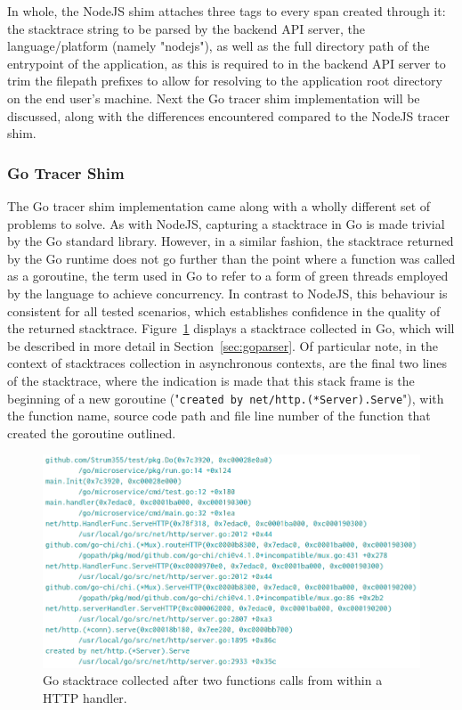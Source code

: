 \documentclass[12pt,pdftex,titlepage]{report}
\begin{document}
                    In whole, the NodeJS shim attaches three tags to every span created through it: the stacktrace string to be parsed by the backend API server, the language/platform (namely "nodejs"), as well
                    as the full directory path of the entrypoint of the application, as this is required to in the backend API server to trim the filepath prefixes to allow for resolving to the application
                    root directory on the end user's machine. Next the Go tracer shim implementation will be discussed, along with the differences encountered compared to the NodeJS tracer shim.

                \subsubsection{Go Tracer Shim}
                    The Go tracer shim implementation came along with a wholly different set of problems to solve. As with NodeJS, capturing a stacktrace in Go is made trivial by the Go standard library. However,
                    in a similar fashion, the stacktrace returned by the Go runtime does not go further than the point where a function was called as a goroutine\cite{goroutine}, the term used in Go to refer to a 
                    form of green threads employed by the language to achieve concurrency. In contrast to NodeJS, this behaviour is consistent for all tested scenarios, which establishes confidence in the quality 
                    of the returned stacktrace. Figure~\ref{fig:gostack} displays a stacktrace collected in Go, which will be described in more detail in Section~\ref{sec:goparser}. Of particular note, in the context
                    of stacktraces collection in asynchronous contexts, are the final two lines of the stacktrace, where the indication is made that this stack frame is the beginning of a new goroutine ("\texttt{created
                    by net/http.(*Server).Serve}"), with the function name, source code path and file line number of the function that created the goroutine outlined.

                    \begin{figure}[hbt!]
                        \centering
                        \includegraphics[scale=0.4]{gostack.png}
                        \caption{Go stacktrace collected after two functions calls from within a HTTP handler.}
                        \label{fig:gostack}
                    \end{figure}
\end{document}
